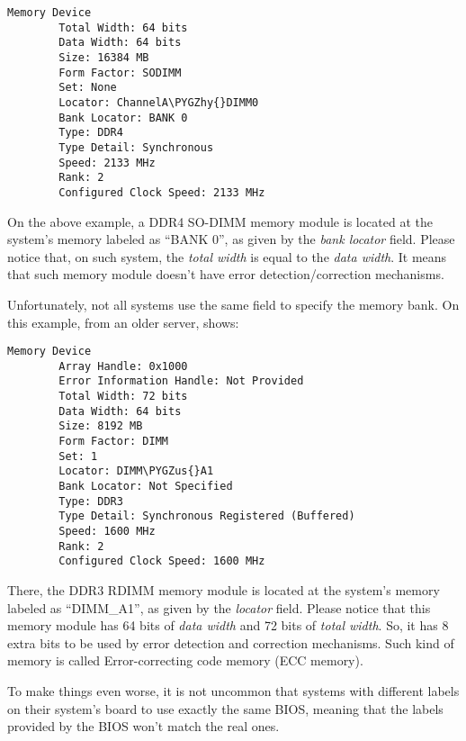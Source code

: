 \documentclass[a4paper,8pt,english]{sphinxmanual}
\def\PYGZus{\char`\_}
\def\PYGZhy{\char`\-}
\begin{document}
\begin{Verbatim}[commandchars=\\\{\}]
Memory Device
        Total Width: 64 bits
        Data Width: 64 bits
        Size: 16384 MB
        Form Factor: SODIMM
        Set: None
        Locator: ChannelA\PYGZhy{}DIMM0
        Bank Locator: BANK 0
        Type: DDR4
        Type Detail: Synchronous
        Speed: 2133 MHz
        Rank: 2
        Configured Clock Speed: 2133 MHz
\end{Verbatim}

On the above example, a DDR4 SO-DIMM memory module is located at the
system's memory labeled as ``BANK 0'', as given by the \emph{bank locator} field.
Please notice that, on such system, the \emph{total width} is equal to the
\emph{data width}. It means that such memory module doesn't have error
detection/correction mechanisms.

Unfortunately, not all systems use the same field to specify the memory
bank. On this example, from an older server,  shows:

\begin{Verbatim}[commandchars=\\\{\}]
Memory Device
        Array Handle: 0x1000
        Error Information Handle: Not Provided
        Total Width: 72 bits
        Data Width: 64 bits
        Size: 8192 MB
        Form Factor: DIMM
        Set: 1
        Locator: DIMM\PYGZus{}A1
        Bank Locator: Not Specified
        Type: DDR3
        Type Detail: Synchronous Registered (Buffered)
        Speed: 1600 MHz
        Rank: 2
        Configured Clock Speed: 1600 MHz
\end{Verbatim}

There, the DDR3 RDIMM memory module is located at the system's memory labeled
as ``DIMM\_A1'', as given by the \emph{locator} field. Please notice that this
memory module has 64 bits of \emph{data width} and 72 bits of \emph{total width}. So,
it has 8 extra bits to be used by error detection and correction mechanisms.
Such kind of memory is called Error-correcting code memory (ECC memory).

To make things even worse, it is not uncommon that systems with different
labels on their system's board to use exactly the same BIOS, meaning that
the labels provided by the BIOS won't match the real ones.
\end{document}
